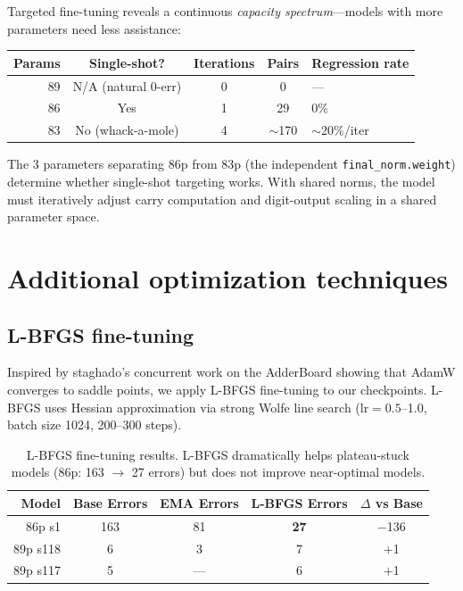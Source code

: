 \documentclass[11pt]{article}
\begin{document}
Targeted fine-tuning reveals a continuous \emph{capacity spectrum}---models
with more parameters need less assistance:

\begin{center}
\begin{tabular}{rcccl}
\toprule
Params & Single-shot? & Iterations & Pairs & Regression rate \\
\midrule
89  & N/A (natural 0-err) & 0 & 0     & --- \\
86  & Yes                 & 1 & 29    & 0\% \\
83  & No (whack-a-mole)   & 4 & $\sim$170 & $\sim$20\%/iter \\
\bottomrule
\end{tabular}
\end{center}

The 3 parameters separating 86p from 83p (the independent
\texttt{final\_norm.weight}) determine whether single-shot targeting
works. With shared norms, the model must iteratively adjust carry
computation and digit-output scaling in a shared parameter space.

\section{Additional optimization techniques}
\label{sec:optimization}

\subsection{L-BFGS fine-tuning}
\label{sec:lbfgs}

Inspired by staghado's concurrent work on the AdderBoard showing that AdamW
converges to saddle points, we apply L-BFGS \citep{liu1989limited}
fine-tuning to our checkpoints. L-BFGS uses Hessian approximation via
strong Wolfe line search ($\text{lr}=0.5$--1.0, batch size 1024, 200--300
steps).

\begin{table}[ht]
\centering
\caption{L-BFGS fine-tuning results. L-BFGS dramatically helps
plateau-stuck models (86p: 163 $\to$ 27 errors) but does not improve
near-optimal models.}
\label{tab:lbfgs}
\vspace{4pt}
\begin{tabular}{@{}rcccc@{}}
\toprule
Model & Base Errors & EMA Errors & L-BFGS Errors & $\Delta$ vs Base \\
\midrule
86p s1   & 163 & 81 & \textbf{27}  & $-$136 \\
89p s118 & 6   & 3  & 7            & $+$1 \\
89p s117 & 5   & ---  & 6          & $+$1 \\
\bottomrule
\end{tabular}
\end{table}
\end{document}

